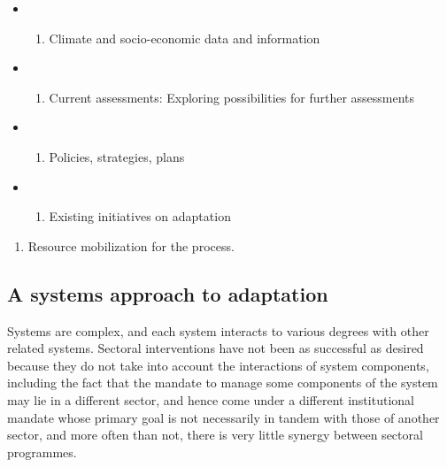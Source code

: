 \documentclass[
]{book}
\providecommand{\tightlist}{%
  \setlength{\itemsep}{0pt}\setlength{\parskip}{0pt}}
\begin{document}
\begin{itemize}
\item
  \begin{enumerate}
  \def\labelenumi{\roman{enumi}.}
  \tightlist
  \item
    Climate and socio-economic data and information
  \end{enumerate}
\item
  \begin{enumerate}
  \def\labelenumi{\roman{enumi}.}
  \setcounter{enumi}{1}
  \tightlist
  \item
    Current assessments: Exploring possibilities for further assessments
  \end{enumerate}
\item
  \begin{enumerate}
  \def\labelenumi{\roman{enumi}.}
  \setcounter{enumi}{2}
  \tightlist
  \item
    Policies, strategies, plans
  \end{enumerate}
\item
  \begin{enumerate}
  \def\labelenumi{\roman{enumi}.}
  \setcounter{enumi}{3}
  \tightlist
  \item
    Existing initiatives on adaptation
  \end{enumerate}
\end{itemize}

\begin{enumerate}
\def\labelenumi{\alph{enumi}.}
\setcounter{enumi}{1}
\tightlist
\item
  Resource mobilization for the process.
\end{enumerate}

\hypertarget{a-systems-approach-to-adaptation}{%
\subsection{A systems approach to adaptation}\label{a-systems-approach-to-adaptation}}

Systems are complex, and each system interacts to various degrees with other related systems. Sectoral interventions have not been as successful as desired
because they do not take into account the interactions of system components, including the fact that the mandate to manage some components of the system may lie
in a different sector, and hence come under a different institutional mandate whose primary goal is not necessarily in tandem with those of another sector, and
more often than not, there is very little synergy between sectoral programmes.
\end{document}
